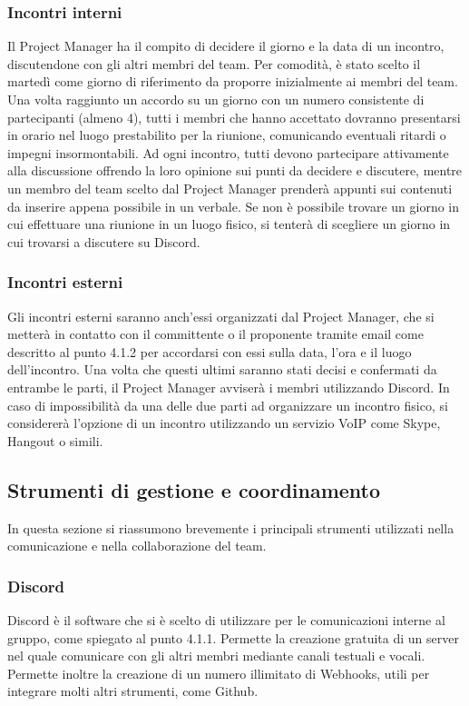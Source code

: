\subsubsection{Incontri interni}
Il Project Manager ha il compito di decidere il giorno e la data di un incontro, discutendone con gli altri membri del team. Per comodità, è stato scelto il martedì come giorno di riferimento da proporre inizialmente ai membri del team.
\newline
Una volta raggiunto un accordo su un giorno con un numero consistente di partecipanti (almeno 4), tutti i membri che hanno accettato dovranno presentarsi in orario nel luogo prestabilito per la riunione, comunicando eventuali ritardi o impegni insormontabili.
Ad ogni incontro, tutti devono partecipare attivamente alla discussione offrendo la loro opinione sui punti da decidere e discutere, mentre un membro del team scelto dal Project Manager prenderà appunti sui contenuti da inserire appena possibile in un verbale.
\newline
Se non è possibile trovare un giorno in cui effettuare una riunione in un luogo fisico, si tenterà di scegliere un giorno in cui trovarsi a discutere su Discord.

\subsubsection{Incontri esterni}
Gli incontri esterni saranno anch'essi organizzati dal Project Manager, che si metterà in contatto con il committente o il proponente tramite email come descritto al punto 4.1.2 per accordarsi con essi sulla data, l'ora e il luogo dell'incontro. Una volta che questi ultimi saranno stati decisi e confermati da entrambe le parti, il Project Manager avviserà i membri utilizzando Discord.
In caso di impossibilità da una delle due parti ad organizzare un incontro fisico, si considererà l'opzione di un incontro utilizzando un servizio VoIP come Skype, Hangout o simili.

\subsection{Strumenti di gestione e coordinamento}
In questa sezione si riassumono brevemente i principali strumenti utilizzati nella comunicazione e nella collaborazione del team.

\subsubsection{Discord}
Discord è il software che si è scelto di utilizzare per le comunicazioni interne al gruppo, come spiegato al punto 4.1.1. Permette la creazione gratuita di un server nel quale comunicare con gli altri membri mediante canali testuali e vocali. Permette inoltre la creazione di un numero illimitato di Webhooks, utili per integrare molti altri strumenti, come Github.

